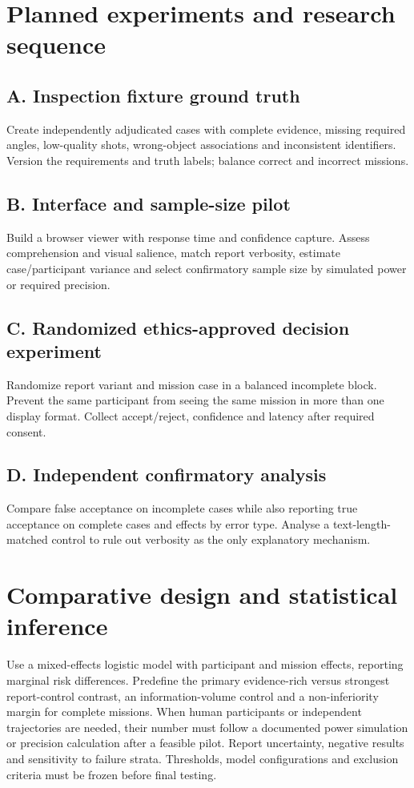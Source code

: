 \documentclass[11pt,a4paper]{article}
\begin{document}
\section{Planned experiments and research sequence}
\subsection{A. Inspection fixture ground truth}
Create independently adjudicated cases with complete evidence, missing required angles, low-quality shots, wrong-object associations and inconsistent identifiers. Version the requirements and truth labels; balance correct and incorrect missions.

\subsection{B. Interface and sample-size pilot}
Build a browser viewer with response time and confidence capture. Assess comprehension and visual salience, match report verbosity, estimate case/participant variance and select confirmatory sample size by simulated power or required precision.

\subsection{C. Randomized ethics-approved decision experiment}
Randomize report variant and mission case in a balanced incomplete block. Prevent the same participant from seeing the same mission in more than one display format. Collect accept/reject, confidence and latency after required consent.

\subsection{D. Independent confirmatory analysis}
Compare false acceptance on incomplete cases while also reporting true acceptance on complete cases and effects by error type. Analyse a text-length-matched control to rule out verbosity as the only explanatory mechanism.

\section{Comparative design and statistical inference}
Use a mixed-effects logistic model with participant and mission effects, reporting marginal risk differences. Predefine the primary evidence-rich versus strongest report-control contrast, an information-volume control and a non-inferiority margin for complete missions. When human participants or independent trajectories are needed, their number must follow a documented power simulation or precision calculation after a feasible pilot. Report uncertainty, negative results and sensitivity to failure strata. Thresholds, model configurations and exclusion criteria must be frozen before final testing.
\end{document}
